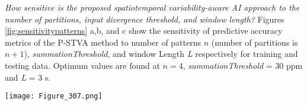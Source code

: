 \documentclass[letterpaper]{article} %
\begin{document}
\begin{table}[h!]
  \begin{center}
    \caption{$NO_{x}$ predictive accuracy for training data}
    \label{tab:trainresult}
  \end{center}
  
  \begin{center}
    \caption{$NO_{x}$ predictive accuracy for testing data}
    \label{tab:testresult}
  \end{center}
\end{table}

\textit{How sensitive is the proposed spatiotemporal variability-aware AI approach to the number of partitions, input divergence threshold, and window length?
} Figures \ref{fig:sensitivitypatterns} a,b, and c show the sensitivity of predictive accuracy metrics of the P-STVA method to number of patterns $n$ (number of partitions is $n + 1$), \textit{summationThreshold}, and window Length \textit{L} respectively for training and testing data. Optimum values are found at $n=4$, \textit{summationThreshold} = 30 ppm and \textit{L} = 3 s.
\begin{figure*}
    \centering
    \texttt{[image: Figure\_307.png]}
    \caption{Sensitivity of the metrics for P-STVA to the a) number of patterns, b) \textit{summationThreshold}, and c) Window length}
    \label{fig:sensitivitypatterns}
\end{figure*}
\end{document}
